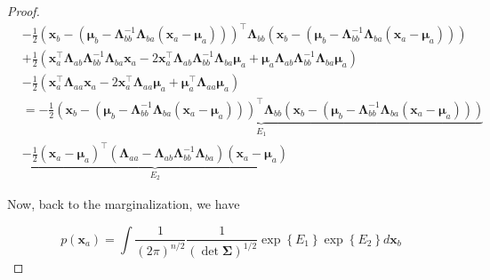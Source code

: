 \begin{appendices}
\begin{proof}
    \begin{equation*}
    \begin{aligned} &-\frac{1}{2}\left(\mathbf{x}_{b}-\left(\boldsymbol{\mu}_{b}-\boldsymbol{\Lambda}_{b b}^{-1} \boldsymbol{\Lambda}_{b a}\left(\mathbf{x}_{a}-\boldsymbol{\mu}_{a}\right)\right)\right)^\top \boldsymbol{\Lambda}_{b b}\left(\mathbf{x}_{b}-\left(\boldsymbol{\mu}_{b}-\boldsymbol{\Lambda}_{b b}^{-1} \boldsymbol{\Lambda}_{b a}\left(\mathbf{x}_{a}-\boldsymbol{\mu}_{a}\right)\right)\right) \\ &+\frac{1}{2}\left(\mathbf{x}_{a}^\top \boldsymbol{\Lambda}_{a b} \boldsymbol{\Lambda}_{b b}^{-1} \boldsymbol{\Lambda}_{b a} \mathbf{x}_{a}-2\mathbf{x}_{a}^\top \boldsymbol{\Lambda}_{a b} \boldsymbol{\Lambda}_{b b}^{-1} \boldsymbol{\Lambda}_{b a} \boldsymbol{\mu}_{a}+\boldsymbol{\mu}_{a} \boldsymbol{\Lambda}_{a b} \boldsymbol{\Lambda}_{b b}^{-1} \boldsymbol{\Lambda}_{b a} \boldsymbol{\mu}_{a}\right) \\ &-\frac{1}{2}\left(\mathbf{x}_{a}^\top \boldsymbol{\Lambda}_{a a} \mathbf{x}_{a}-2 \mathbf{x}_{a}^\top \boldsymbol{\Lambda}_{a a} \boldsymbol{\mu}_{a}+\boldsymbol{\mu}_{a}^\top \boldsymbol{\Lambda}_{a a} \boldsymbol{\mu}_{a}\right) \\ &=\underbrace{-\frac{1}{2}\left(\mathbf{x}_{b}-\left(\boldsymbol{\mu}_{b}-\boldsymbol{\Lambda}_{b b}^{-1} \boldsymbol{\Lambda}_{b a}\left(\mathbf{x}_{a}-\boldsymbol{\mu}_{a}\right)\right)\right)^\top \boldsymbol{\Lambda}_{b b}\left(\mathbf{x}_{b}-\left(\boldsymbol{\mu}_{b}-\boldsymbol{\Lambda}_{b b}^{-1} \boldsymbol{\Lambda}_{b a}\left(\mathbf{x}_{a}-\boldsymbol{\mu}_{a}\right)\right)\right)}_{E_1} \\ &\underbrace{-\frac{1}{2}\left(\mathbf{x}_{a}-\boldsymbol{\mu}_{a}\right)^\top\left(\boldsymbol{\Lambda}_{a a}-\boldsymbol{\Lambda}_{a b} \boldsymbol{\Lambda}_{b b}^{-1} \boldsymbol{\Lambda}_{b a}\right)\left(\mathbf{x}_{a}-\boldsymbol{\mu}_{a}\right)}_{E_2} \end{aligned}
    \end{equation*}

    Now, back to the marginalization, we have

    \begin{equation}
      \label{eq:app-par-gau-marginalization-1}
      p\left(\mathbf{x}_{a}\right)=\int \frac{1}{(2 \pi)^{n / 2}} \frac{1}{ \left( \det \mathbf{\Sigma} \right) ^{1 / 2}} \exp \left\{ E_1 \right\} \exp \left\{ E_2 \right\} d \mathbf{x}_b
    \end{equation}


\end{proof}
\end{appendices}
